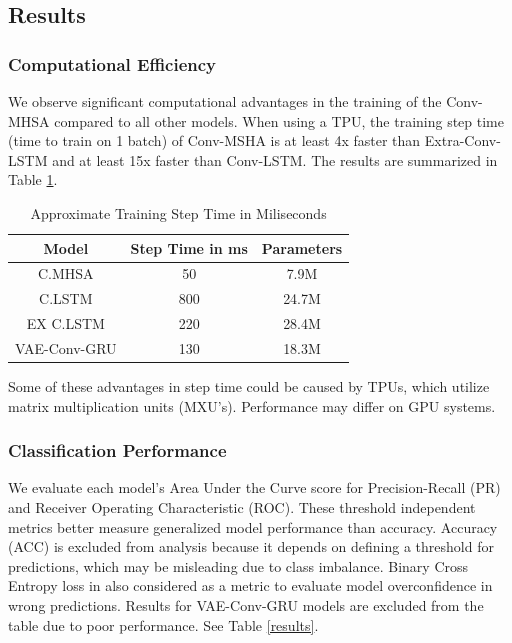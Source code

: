 \documentclass[letterpaper]{article} %
\begin{document}
\subsection{Results}

\subsubsection{Computational Efficiency}

We observe significant computational advantages in the training of the Conv-MHSA compared to all other models. When using a TPU, the training step time (time to train on 1 batch) of Conv-MSHA is at least 4x faster than Extra-Conv-LSTM and at least 15x faster than Conv-LSTM. The results are summarized in Table \ref{Compute Time}.


\begin{table}[t!]
\centering
\begin{tabular}{ |c|c|c| }
 \hline
 Model & Step Time in ms & Parameters\\
 \hline
 C.MHSA & 50 & 7.9M\\
 \hline
 C.LSTM & 800 & 24.7M\\
 \hline
 EX C.LSTM & 220 & 28.4M\\
 \hline
 VAE-Conv-GRU &  130 & 18.3M\\
 \hline
\end{tabular}
\caption{Approximate Training Step Time in Miliseconds}
\label{Compute Time}
\end{table}

Some of these advantages in step time could be caused by TPUs, which utilize matrix multiplication units (MXU's). Performance may differ on GPU systems.


\subsubsection{Classification Performance}

We evaluate each model's Area Under the Curve score for Precision-Recall (PR) and Receiver Operating Characteristic (ROC). These threshold independent metrics better measure generalized model performance than accuracy. Accuracy (ACC) is excluded from analysis because it depends on defining a threshold for predictions, which may be misleading due to class imbalance. Binary Cross Entropy loss in also considered as a metric to evaluate model overconfidence in wrong predictions. Results for VAE-Conv-GRU models are excluded from the table due to poor performance. See Table \ref{results}.
\end{document}
